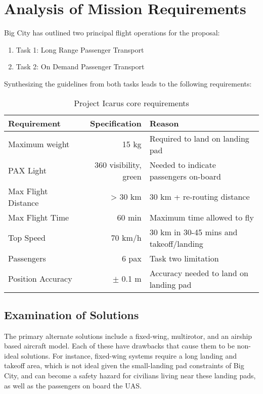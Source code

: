 \section{Analysis of Mission Requirements}
\label{sec:analysis}

Big City has outlined two principal flight operations for the proposal:
\begin{enumerate}
    \item Task 1: Long Range Passenger Transport
    \item Task 2: On Demand Passenger Transport
\end{enumerate}
Synthesizing the guidelines from both tasks leads to the following requirements:
{
\renewcommand{\arraystretch}{1.1}
\begin{table}[h]
\centering
\begin{tabular}{lrl}
\color{hyperrideblue} \textbf{Requirement} &
\color{hyperrideblue} \textbf{Specification} &
\color{hyperrideblue} \textbf{Reason}                   \\ \midrule
    Maximum weight       & 15 kg           & Required to land on landing pad        \\
	PAX Light            & 360\textdegree{}  visibility, green    & Needed to indicate passengers on-board \\
Max Flight Distance  & > 30 km       & 30 km + re-routing distance            \\
Max Flight Time      & 60 min        & Maximum time allowed to fly            \\
Top Speed            & 70 km/h       & 30 km in 30-45 mins and takeoff/landing\\  
 Passengers       &    6 pax  & Task two limitation                    \\
Position Accuracy    & $\pm$ 0.1 m   & Accuracy needed to land on landing pad
\end{tabular}
\caption{Project Icarus core requirements}
\end{table}
}

\subsection{Examination of Solutions}
\label{sec:solutions}

The primary alternate solutions include a fixed-wing, multirotor, and an
airship based aircraft model. Each of these have drawbacks that cause them to
be non-ideal solutions. For instance, fixed-wing systems require a long landing
and takeoff area, which is not ideal given the small-landing pad constraints of
Big City, and can become a safety hazard for civilians living near these
landing pads, as well as the passengers on board the UAS.

